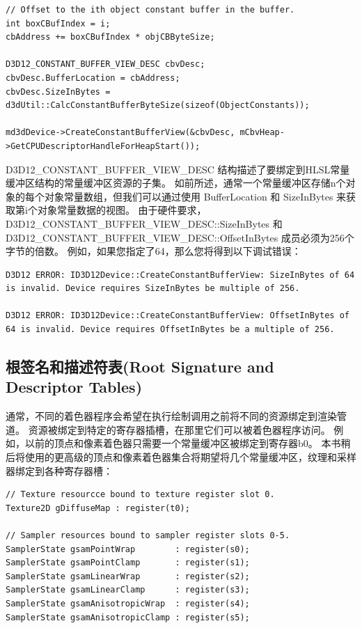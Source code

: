 \documentclass[11pt,a4paper,oldfontcommands]{memoir}
\begin{document}
{\begin{lstlisting}
// Offset to the ith object constant buffer in the buffer.
int boxCBufIndex = i;
cbAddress += boxCBufIndex * objCBByteSize;

D3D12_CONSTANT_BUFFER_VIEW_DESC cbvDesc;
cbvDesc.BufferLocation = cbAddress;
cbvDesc.SizeInBytes = d3dUtil::CalcConstantBufferByteSize(sizeof(ObjectConstants));

md3dDevice->CreateConstantBufferView(&cbvDesc, mCbvHeap->GetCPUDescriptorHandleForHeapStart());
\end{lstlisting}
\begin{flushleft}
D3D12\_CONSTANT\_BUFFER\_VIEW\_DESC 结构描述了要绑定到HLSL常量缓冲区结构的常量缓冲区资源的子集。 如前所述，通常一个常量缓冲区存储n个对象的每个对象常量数组，但我们可以通过使用 BufferLocation 和 SizeInBytes 来获取第i个对象常量数据的视图。 由于硬件要求，D3D12\_CONSTANT\_BUFFER\_VIEW\_DESC::SizeInBytes 和D3D12\_CONSTANT\_BUFFER\_VIEW\_DESC::OffsetInBytes 成员必须为256个字节的倍数。 例如，如果您指定了64，那么您将得到以下调试错误：\\
\end{flushleft}
\begin{lstlisting}
D3D12 ERROR: ID3D12Device::CreateConstantBufferView: SizeInBytes of 64 is invalid. Device requires SizeInBytes be multiple of 256.

D3D12 ERROR: ID3D12Device::CreateConstantBufferView: OffsetInBytes of 64 is invalid. Device requires OffsetInBytes be a multiple of 256.
\end{lstlisting}

\subsection{根签名和描述符表(Root Signature and Descriptor Tables)}
\begin{flushleft}
通常，不同的着色器程序会希望在执行绘制调用之前将不同的资源绑定到渲染管道。 资源被绑定到特定的寄存器插槽，在那里它们可以被着色器程序访问。 例如，以前的顶点和像素着色器只需要一个常量缓冲区被绑定到寄存器b0。 本书稍后将使用的更高级的顶点和像素着色器集合将期望将几个常量缓冲区，纹理和采样器绑定到各种寄存器槽：\\
\begin{lstlisting}
// Texture resourcce bound to texture register slot 0.
Texture2D gDiffuseMap : register(t0);

// Sampler resources bound to sampler register slots 0-5.
SamplerState gsamPointWrap        : register(s0);
SamplerState gsamPointClamp       : register(s1);
SamplerState gsamLinearWrap       : register(s2);
SamplerState gsamLinearClamp      : register(s3);
SamplerState gsamAnisotropicWrap  : register(s4);
SamplerState gsamAnisotropicClamp : register(s5);


\end{lstlisting}
\end{flushleft}}
\end{document}
